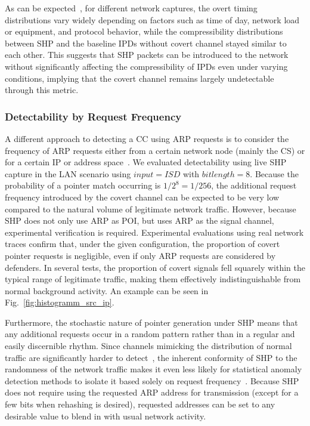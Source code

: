 \documentclass[journal]{IEEEtran}
\begin{document}
As can be expected~\cite{impactofequipment2012}, for different network captures, the overt timing distributions vary widely depending on factors such as time of day, network load or equipment, and protocol behavior, while the compressibility distributions between \ac{SHP} and the baseline \ac{IPD}s without covert channel stayed similar to each other. This suggests that \ac{SHP} packets can be introduced to the network without significantly affecting the compressibility of \ac{IPD}s even under varying conditions, implying that the covert channel remains largely undetectable through this metric. 

\subsubsection{Detectability by Request Frequency}
A different approach to detecting a \ac{CC} using ARP requests is to consider the frequency of ARP requests either from a certain network node (mainly the \ac{CS}) or for a certain \ac{IP} or address space~\cite{Ondov2022Covert,Chen2015A}. We evaluated detectability using live \ac{SHP} capture in the LAN scenario using $input=ISD$ with $bitlength=8$. Because the probability of a pointer match occurring is \(1/2^8 = 1/256\), the additional request frequency introduced by the covert channel can be expected to be very low compared to the natural volume of legitimate network traffic. However, because \ac{SHP} does not only use \ac{ARP} as \ac{POI}, but uses \ac{ARP} as the signal channel, experimental verification is required.
Experimental evaluations using real network traces confirm that, under the given configuration, the proportion of covert pointer requests is negligible, even if only \ac{ARP} requests are considered by defenders. In several tests, the proportion of covert signals fell squarely within the typical range of legitimate traffic, making them effectively indistinguishable from normal background activity. An example can be seen in Fig.~\ref{fig:histogramm_src_ip}.

Furthermore, the stochastic nature of pointer generation under \ac{SHP} means that any additional requests occur in a random pattern rather than in a regular and easily discernible rhythm. Since channels mimicking the distribution of normal traffic are significantly harder to detect~\cite{Zhang2014Network}, the inherent conformity of \ac{SHP} to the randomness of the network traffic makes it even less likely for statistical anomaly detection methods to isolate it based solely on request frequency~\cite{noratelimiting11}. Because \ac{SHP} does not require using the requested ARP address for transmission (except for a few bits when rehashing is desired), requested addresses can be set to any desirable value to blend in with usual network activity. 
\end{document}
